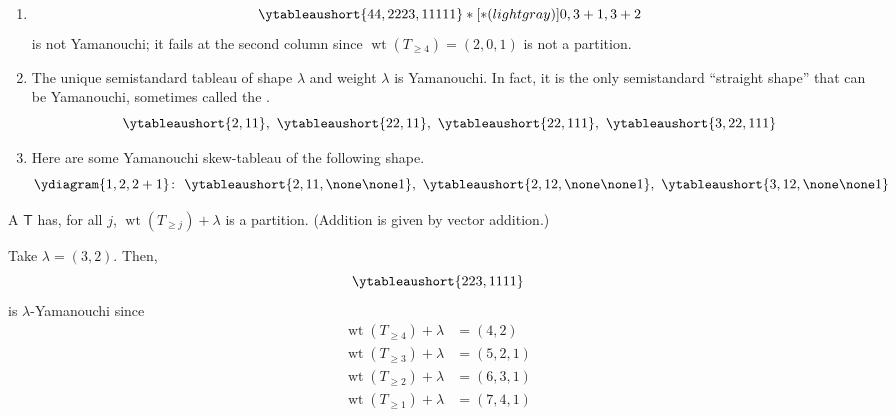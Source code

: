 \documentclass[11pt,leqno,oneside]{amsart}
\numberwithin{thm}{section}
\newcommand{\T}{\mathsf{T}} %
\newcommand{\wt}{\operatorname{wt}}
\begin{document}
\begin{example} \label{super-semistandard}
  \begin{enumerate}
  \item   \[
    \ytableaushort{44,2223,11111}*[*(lightgray)]{0,3+1,3+2}
  \]
  is not Yamanouchi; it fails at the second column since \(\wt(T_{\geq
  4}) = (2,0,1)\) is not a partition.
  \item The unique semistandard tableau of shape \(\lambda\) and
    weight \(\lambda\) 
    is Yamanouchi. In fact, it is the only semistandard ``straight
    shape'' that can 
    be Yamanouchi, sometimes called the .  \[
      \ytableaushort{2,11},\ \ytableaushort{22,11},\
      \ytableaushort{22,111},\ \ytableaushort{3,22,111}
    \]
  \item Here are some Yamanouchi skew-tableau of the following
    shape. \[
      \ydiagram{1,2,2+1} \colon \ \ytableaushort{2,11,\none\none1}, \
      \ytableaushort{2,12,\none\none1}, \ \ytableaushort{3,12,\none\none1}
    \]
  \end{enumerate}
\end{example}
\begin{defn}
  A  \(\T\) has, for all \(j\),
  \(\wt(T_{\geq j}) + \lambda\) is a partition. (Addition is given by
  vector addition.)
\end{defn}
\begin{example}
  Take \(\lambda = (3,2)\). Then, \[
    \ytableaushort{223,1111}
  \]
  is \(\lambda\)-Yamanouchi since
  \begin{align*}
    \wt(T_{\geq 4})+\lambda & = (4,2)\\
    \wt(T_{\geq 3})+\lambda & = (5,2,1)\\
    \wt(T_{\geq 2})+\lambda & = (6,3,1)\\
    \wt(T_{\geq 1})+\lambda & = (7,4,1)
  \end{align*}
\end{example}
\end{document}
